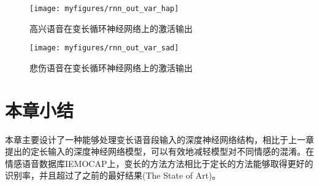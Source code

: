 \begin{figure}[htb] %
    \centering
    \texttt{[image: myfigures/rnn\_out\_var\_hap]}
    \caption{高兴语音在变长循环神经网络上的激活输出}
    \label{fig:rnn_out_hap}
\end{figure}

\begin{figure}[htb] %
    \centering
    \texttt{[image: myfigures/rnn\_out\_var\_sad]}
    \caption{悲伤语音在变长循环神经网络上的激活输出}
    \label{fig:rnn_out_sad}
\end{figure}


\section{本章小结}
\label{sec:var_len_summary}

本章主要设计了一种能够处理变长语音段输入的深度神经网络结构，相比于上一章提出的定长输入的深度神经网络模型，可以有效地减轻模型对不同情感的混淆。在情感语音数据库IEMOCAP上，变长的方法方法相比于定长的方法能够取得更好的识别率，并且超过了之前的最好结果(The State of Art)。